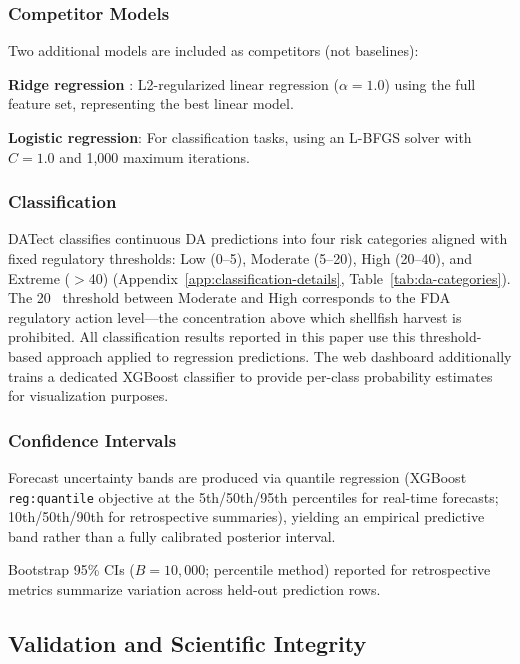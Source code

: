 \documentclass[toxins,article,submit,moreauthors]{Definitions/mdpi}
\begin{document}
\subsubsection{Competitor Models}

Two additional models are included as competitors (not baselines):

\textbf{Ridge regression} \cite{Hoerl1970}: L2-regularized linear regression ($\alpha = 1.0$) using the full feature set, representing the best linear model.

\textbf{Logistic regression}: For classification tasks, using an L-BFGS solver with $C = 1.0$ and 1,000 maximum iterations.

\subsubsection{Classification}
\label{sec:classification}

DATect classifies continuous DA predictions into four risk categories aligned with fixed regulatory thresholds: Low (0--5), Moderate (5--20), High (20--40), and Extreme ($>$40) \si{\microgrampeg} (Appendix~\ref{app:classification-details}, Table~\ref{tab:da-categories}). The 20~\si{\microgrampeg} threshold between Moderate and High corresponds to the FDA regulatory action level---the concentration above which shellfish harvest is prohibited. All classification results reported in this paper use this threshold-based approach applied to regression predictions. The web dashboard additionally trains a dedicated XGBoost classifier to provide per-class probability estimates for visualization purposes.

\subsubsection{Confidence Intervals}

\begin{sloppypar}
Forecast uncertainty bands are produced via quantile regression \cite{Koenker1978} (XGBoost \texttt{reg:quantile} objective at the 5th/50th/95th percentiles for real-time forecasts; 10th/50th/90th for retrospective summaries), yielding an empirical predictive band rather than a fully calibrated posterior interval.
\end{sloppypar} Bootstrap 95\% CIs ($B = 10{,}000$; percentile method) reported for retrospective metrics summarize variation across held-out prediction rows.

\subsection{Validation and Scientific Integrity}
\label{sec:validation}
\end{document}
